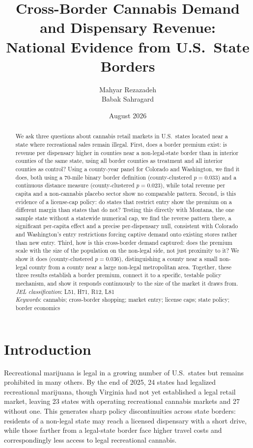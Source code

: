 \documentclass[12pt]{article}
\title{Cross-Border Cannabis Demand and Dispensary Revenue:\\
National Evidence from U.S.\ State Borders}
\author{Mahyar Rezazadeh \\ Babak Sahragard}
\date{August 2026}
\begin{document}
\maketitle

\begin{singlespace}
\begin{abstract}
\noindent We ask three questions about cannabis retail markets in U.S.\ states located near a state where
recreational sales remain illegal. First, does a border premium exist: is revenue per dispensary higher in
counties near a non-legal-state border than in interior counties of the same state, using all border
counties as treatment and all interior counties as control? Using a county-year panel for Colorado and
Washington, we find it does, both using a 70-mile binary border definition (county-clustered $p=0.033$) and
a continuous distance measure (county-clustered $p=0.023$), while total revenue per capita and a
non-cannabis placebo sector show no comparable pattern. Second, is this evidence of a license-cap policy: do
states that restrict entry show the premium on a different margin than states that do not? Testing this
directly with Montana, the one sample state without a statewide numerical cap, we find the reverse pattern
there, a significant per-capita effect and a precise per-dispensary null, consistent with Colorado and
Washington's entry restrictions forcing captive demand onto existing stores rather than new entry. Third, how
is this cross-border demand captured: does the premium scale with the size of the population on the
non-legal side, not just proximity to it? We show it does (county-clustered $p=0.036$), distinguishing a
county near a small non-legal county from a county near a large non-legal metropolitan area. Together, these
three results establish a border premium, connect it to a specific, testable policy mechanism, and show it
responds continuously to the size of the market it draws from.\\[1em]
\textit{JEL classification}: L51, H71, R12, L81\\
\textit{Keywords}: cannabis; cross-border shopping; market entry; license caps; state policy; border economics
\end{abstract}
\end{singlespace}

\section{Introduction}

Recreational marijuana is legal in a growing number of U.S.\ states but remains prohibited in many others. By
the end of 2025, 24 states had legalized recreational marijuana, though Virginia had not yet established a
legal retail market, leaving 23 states with operating recreational cannabis markets and 27 without one. This
generates sharp policy discontinuities across state borders: residents of a non-legal state may reach a
licensed dispensary with a short drive, while those farther from a legal-state border face higher travel
costs and correspondingly less access to legal recreational cannabis.
\end{document}
